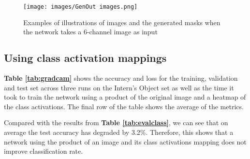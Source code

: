\documentclass{l4proj}
\begin{document}
\begin{figure}[H]
    \centering
    \texttt{[image: images/GenOut images.png]}
    \caption{Examples of illustrations of images and the generated masks when the network takes a 6-channel image as input}
    \label{fig:genoutmask} 
\end{figure}

\subsection{Using class activation mappings}
\textbf{Table \ref{tab:gradcam}} shows the accuracy and loss for the training, validation and test set across three runs on the Intern's Object set as well as the time it took to train the network using a product of the original image and a heatmap of the class activations. The final row of the table shows the average of the metrics.

Compared with the results from \textbf{Table \ref{tab:evalclass}}, we can see that on average the test accuracy has degraded by 3.2\%. Therefore, this shows that a network using the product of an image and its class activations mapping does not improve classification rate.
\end{document}
